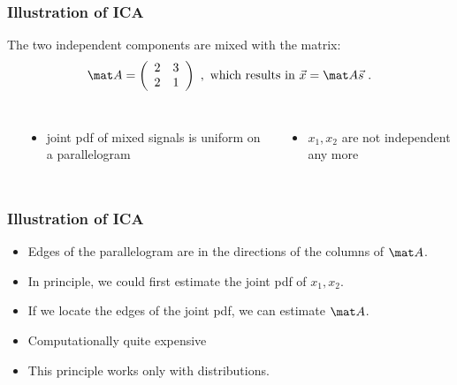 \begin{frame}
  \frametitle{Illustration of ICA \cont}

  The two independent components are mixed with the matrix:
  {\footnotesize
  \begin{displaymath}
    \mat A = \left(
               \begin{array}{cc}
                 2 & 3 \\
                 2 & 1
               \end{array} 
             \right) ~\normalsize ,~\mbox{which results in}~ \vec x = \mat A \vec s ~.
  \end{displaymath}
  }

  \begin{columns}
    \pause
      \vspace*{-.7cm}
      \begin{center}
        \resizebox{0.9\linewidth}{!}{
          
        }
      \end{center}
      \pause
      \begin{itemize}
        \item joint pdf of mixed signals is uniform on a parallelogram \\[.3cm] \pause 
      \end{itemize}

      \begin{itemize}
        \item $x_1, x_2$ are not independent any more
      \end{itemize}
  \end{columns}
\end{frame}


\begin{frame}
  \frametitle{Illustration of ICA \cont}


  \begin{itemize}
    \item Edges of the parallelogram are in the directions of the columns of $\mat A$. \pause
    \item In principle, we could first estimate the joint pdf of $x_1, x_2$. \pause 
    \item If we locate the edges of the joint pdf, we can estimate $\mat A$.
  \end{itemize}
  \pspread


  \begin{itemize}
    \item Computationally quite expensive
    \item This principle works only with  distributions.
  \end{itemize}
\end{frame}


